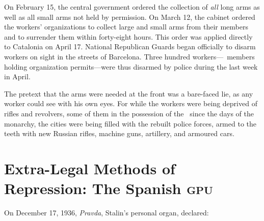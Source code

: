 On February 15, the central government ordered the collection of \emph{all} long arms as well as all small arms not held by permission. On March 12, the cabinet ordered the workers’ organizations to collect large and small arms from their members and to surrender them within forty-eight hours. This order was applied directly to Catalonia on April 17. National Republican Guards began officially to disarm workers on sight in the streets of Barcelona. Three hundred workers---\CNT\ members holding organization permits---were thus disarmed by police during the last week in April.

The pretext that the arms were needed at the front was a bare-faced lie, as any worker could see with his own eyes. For while the workers were being deprived of rifles and revolvers, some of them in the possession of the \CNT\ since the days of the monarchy, the cities were being filled with the rebuilt police forces, armed to the teeth with new Russian rifles, machine guns, artillery, and armoured cars.

\section*{Extra-Legal Methods of Repression: The Spanish \textsc{gpu}}

On December 17, 1936, \emph{Pravda}, Stalin’s personal organ, declared:

